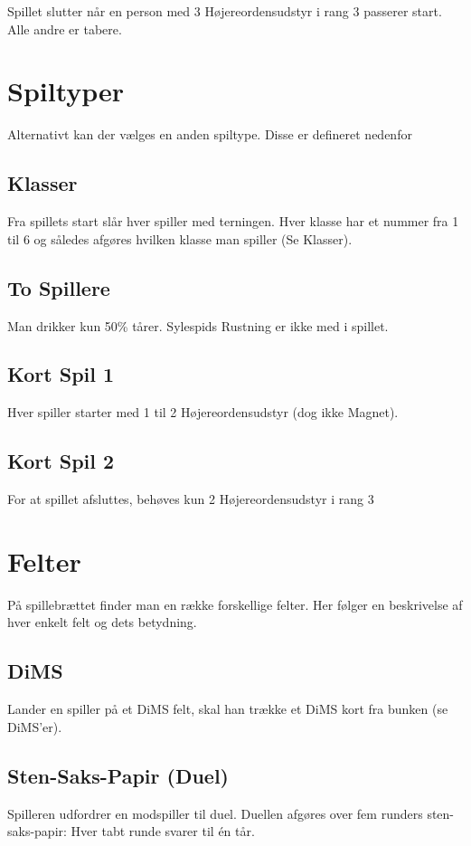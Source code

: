 \documentclass{article}
\begin{document}
 Spillet slutter når en person med 3 Højereordensudstyr i rang 3 passerer start. Alle andre er tabere. 

\section{Spiltyper}
 
  Alternativt kan der vælges en anden spiltype. Disse er defineret nedenfor
 
\subsection{Klasser}
Fra spillets start slår hver spiller med terningen. Hver klasse har et nummer fra 1 til 6 og således afgøres hvilken klasse man spiller (Se Klasser).
 
\subsection{To Spillere}
Man drikker kun 50\% tårer.
Sylespids Rustning er ikke med i spillet.
  
\subsection{Kort Spil 1}
Hver spiller starter med 1 til 2 Højereordensudstyr (dog ikke Magnet).

\subsection{Kort Spil 2}
For at spillet afsluttes, behøves kun 2 Højereordensudstyr i rang 3

\pagebreak

\section{Felter}
På spillebrættet finder man en række forskellige felter. Her følger en beskrivelse af hver enkelt felt og dets betydning.
 
\subsection{DiMS}
Lander en spiller på et DiMS felt, skal han trække et DiMS kort fra bunken (se DiMS'er).
 
\subsection{Sten-Saks-Papir (Duel)}
Spilleren udfordrer en modspiller til duel. Duellen afgøres over fem runders sten-saks-papir: Hver tabt runde svarer til én tår.
 
\end{document}
